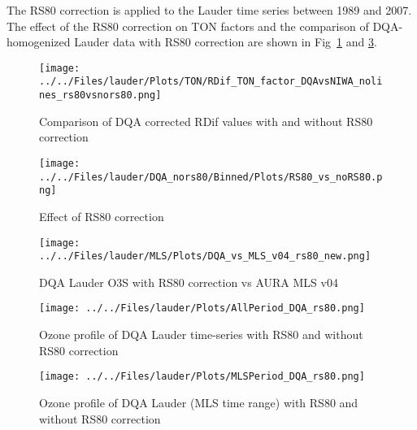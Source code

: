     The RS80 correction is applied to the Lauder time series between 1989 and 2007. The effect of the RS80 correction on TON factors
and the comparison of DQA-homogenized Lauder data with RS80 correction are shown in Fig~\ref{fig:rdif_rs80} and \ref{fig:mlsrs80}.

                                \begin{figure}
        \centering
\texttt{[image: ../../Files/lauder/Plots/TON/RDif\_TON\_factor\_DQAvsNIWA\_nolines\_rs80vsnors80.png]}
    \caption{Comparison of DQA corrected RDif values with and without RS80 correction}
            \label{fig:rdif_rs80}
    \end{figure}

                                    \begin{figure}
        \centering
\texttt{[image: ../../Files/lauder/DQA\_nors80/Binned/Plots/RS80\_vs\_noRS80.png]}
    \caption{Effect of  RS80 correction}
            \label{fig:heatmap_rs80}
    \end{figure}

                                \begin{figure}
        \centering
\texttt{[image: ../../Files/lauder/MLS/Plots/DQA\_vs\_MLS\_v04\_rs80\_new.png]}
    \caption{ DQA Lauder O3S with RS80 correction vs AURA MLS v04  }
            \label{fig:mlsrs80}
    \end{figure}


                                \begin{figure}
        \centering
\texttt{[image: ../../Files/lauder/Plots/AllPeriod\_DQA\_rs80.png]}
    \caption{Ozone profile of DQA Lauder time-series with RS80 and without RS80 correction  }
            \label{fig:profile_dqa}
    \end{figure}

                                \begin{figure}
        \centering
\texttt{[image: ../../Files/lauder/Plots/MLSPeriod\_DQA\_rs80.png]}
    \caption{Ozone profile of DQA Lauder (MLS time range) with RS80 and without RS80 correction  }
            \label{fig:profile_dqa_mls}
    \end{figure}





